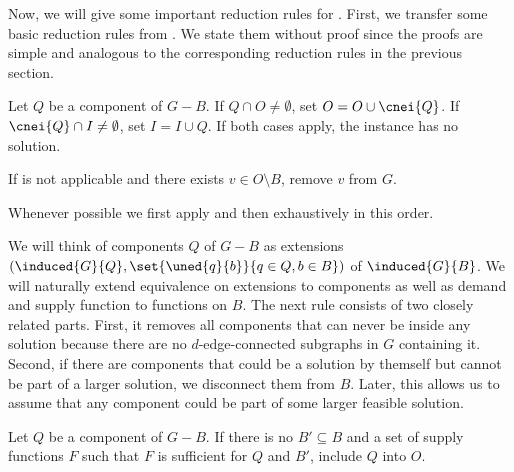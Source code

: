 \begin{lemma}
\begin{lemma}
\begin{lemma}
\begin{lemma}
\begin{lemma}
\begin{theorem}
Now, we will give some important reduction rules for \probborder{}. First, we transfer some basic reduction rules from . We state them without proof since the proofs are simple and analogous to the corresponding reduction rules in the previous section.

\begin{reduction*}\label{red:d_edge_in_out}
  Let $Q$ be a component of $G - B$. If $Q \cap O \ne \emptyset$, set $O = O \cup \cnei{Q}$. If $\cnei{Q} \cap I \ne \emptyset$, set $I = I \cup Q$. If both cases apply, the instance has no solution.
\end{reduction*}
\begin{reduction*}\label{red:d_edge_remove_out}
  If  is not applicable and there exists $v \in O \setminus B$, remove $v$ from $G$.
\end{reduction*}

Whenever possible we first apply  and then  exhaustively in this order.

We will think of components $Q$ of $G-B$ as extensions $(\induced{G}{Q}, \set{\uned{q}{b}}{q \in Q, b \in B})$ of $\induced{G}{B}$. We will naturally extend equivalence on extensions to components as well as demand and supply function to functions on $B$.
The next rule consists of two closely related parts. First, it removes all components that can never be inside any solution because there are no $d$-edge-connected subgraphs in $G$ containing it. Second, if there are components that could be a solution by themself but cannot be part of a larger solution, we disconnect them from $B$. Later, this allows us to assume that any component could be part of some larger feasible solution.

\iflong
\begin{reduction*}
\else
\begin{reduction*}[$\star$]
\fi
\label{red:remove_useless}
  Let $Q$ be a component of $G - B$. If there is no $B' \subseteq B$ and a set of supply functions $F$ such that $F$ is sufficient for $Q$ and $B'$, include $Q$ into $O$.


\end{reduction*}
\end{reduction*}
\end{theorem}
\end{lemma}
\end{lemma}
\end{lemma}
\end{lemma}
\end{lemma}
